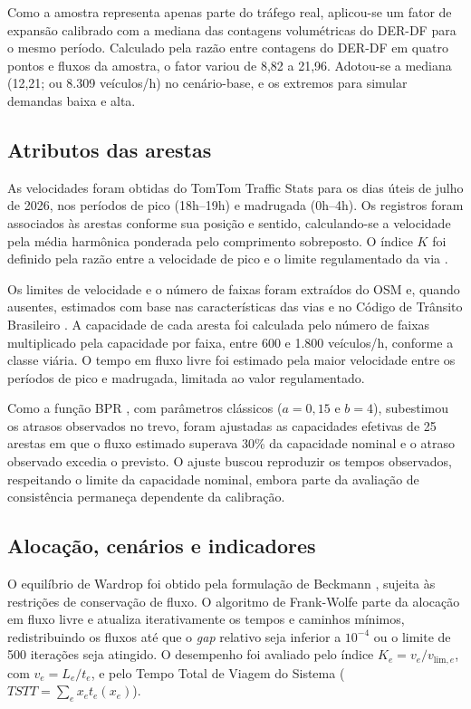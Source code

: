 \documentclass[portuguese]{sbc2025}%
\begin{document}
Como a amostra representa apenas parte do tráfego real, aplicou-se um fator de expansão calibrado com a mediana das contagens volumétricas do DER-DF para o mesmo período. Calculado pela razão entre contagens do DER-DF em quatro pontos e fluxos da amostra, o fator variou de 8,82 a 21,96. Adotou-se a mediana (12,21; ou 8.309 veículos/h) no cenário-base, e os extremos para simular demandas baixa e alta.

\subsection{Atributos das arestas}

As velocidades foram obtidas do TomTom Traffic Stats para os dias úteis de julho de 2026, nos períodos de pico (18h--19h) e madrugada (0h--4h). Os registros foram associados às arestas conforme sua posição e sentido, calculando-se a velocidade pela média harmônica ponderada pelo comprimento sobreposto. O índice $K$ foi definido pela razão entre a velocidade de pico e o limite regulamentado da via \cite{he2016spi}.

Os limites de velocidade e o número de faixas foram extraídos do OSM e, quando ausentes, estimados com base nas características das vias e no Código de Trânsito Brasileiro \cite{ctb2026}. A capacidade de cada aresta foi calculada pelo número de faixas multiplicado pela capacidade por faixa, entre 600 e 1.800 veículos/h, conforme a classe viária. O tempo em fluxo livre foi estimado pela maior velocidade entre os períodos de pico e madrugada, limitada ao valor regulamentado.

Como a função BPR \cite{bpr1964}, com parâmetros clássicos ($a=0{,}15$ e $b=4$), subestimou os atrasos observados no trevo, foram ajustadas as capacidades efetivas de 25 arestas em que o fluxo estimado superava 30\% da capacidade nominal e o atraso observado excedia o previsto. O ajuste buscou reproduzir os tempos observados, respeitando o limite da capacidade nominal, embora parte da avaliação de consistência permaneça dependente da calibração.

\subsection{Alocação, cenários e indicadores}

O equilíbrio de Wardrop foi obtido pela formulação de Beckmann \cite{beckmann1956}, sujeita às restrições de conservação de fluxo. O algoritmo de Frank-Wolfe \cite{frank1956} parte da alocação em fluxo livre e atualiza iterativamente os tempos e caminhos mínimos, redistribuindo os fluxos até que o \textit{gap} relativo seja inferior a $10^{-4}$ ou o limite de 500 iterações seja atingido. O desempenho foi avaliado pelo índice $K_e=v_e/v_{\text{lim},e}$, com $v_e=L_e/t_e$, e pelo Tempo Total de Viagem do Sistema ($TSTT=\sum_e x_e t_e(x_e)$).
\end{document}
